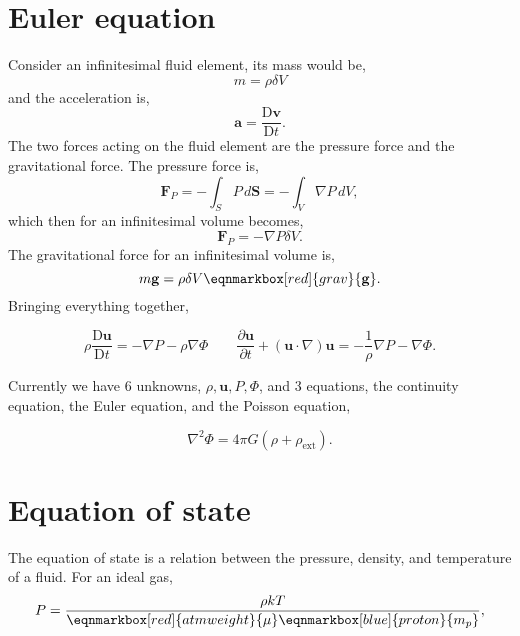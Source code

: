 \section{Euler equation}
Consider an infinitesimal fluid element, its mass would be, 
\begin{equation}
  m = \rho\delta V 
\end{equation}
and the acceleration is, 
\begin{equation}
  \mathbf{a} = \frac{\text{D}\mathbf{v}}{\text{D}t}.
\end{equation}
The two forces acting on the fluid element are the pressure force and the gravitational force. The pressure force is, 
\begin{equation}
  \mathbf{F}_P = - \int_S P\, d\mathbf{S} = -\int_V \nabla P\, dV, 
\end{equation}
which then for an infinitesimal volume becomes,
\begin{equation}
  \mathbf{F}_P = -\nabla P\delta V. 
\end{equation}
The gravitational force for an infinitesimal volume is, 
\begin{equation}
  m\mathbf{g} = \rho\delta V\eqnmarkbox[red]{grav}{\mathbf{g}}. 
\end{equation}
\hspace{-5.5mm} Bringing everything together,
\begin{definition}
\begin{equation}
  \rho\frac{\text{D}\mathbf{u}}{\text{D}t} = -\nabla P - \rho\nabla\Phi \quad\quad \frac{\partial\mathbf{u}}{\partial t} + (\mathbf{u}\cdot\nabla)\mathbf{u} = -\frac{1}{\rho}\nabla P - \nabla\Phi. 
\end{equation}
\vspace{-5mm}
\end{definition} 

Currently we have 6 unknowns, $\rho, \mathbf{u}, P, \Phi$, and 3 equations, the continuity equation, the Euler equation, and the Poisson equation,
\begin{definition}
\begin{equation}
  \nabla^2\Phi = 4\pi G(\rho + \rho_\text{ext}). 
\end{equation}
\vspace{-5mm}
\end{definition}

\section{Equation of state}
The equation of state is a relation between the pressure, density, and temperature of a fluid. For an ideal gas, 
\begin{equation}
  P = \frac{\rho k T}{\eqnmarkbox[red]{atmweight}{\mu} \eqnmarkbox[blue]{proton}{m_p}}, 
\end{equation}
\\


